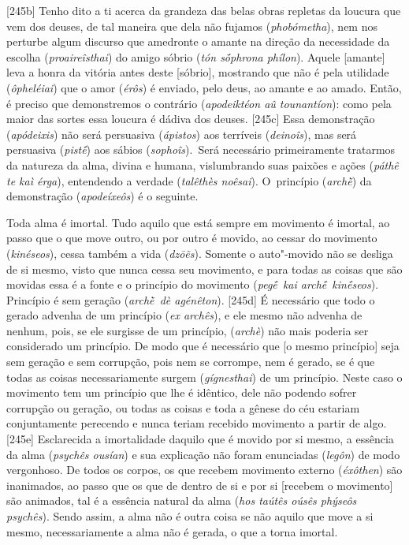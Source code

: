[245b] Tenho dito a ti acerca da grandeza das belas obras repletas
da loucura que vem dos deuses, de tal maneira que dela não fujamos
(\emph{phobómetha}), nem nos perturbe algum discurso que amedronte o
amante na direção da necessidade da escolha (\emph{proaireîsthai}) do
amigo sóbrio (\emph{tón sṓphrona phílon}). Aquele [amante] leva a
honra da vitória antes deste [sóbrio], mostrando que não é pela
utilidade (\emph{ôpheléiai}) que o amor (\emph{érôs}) é enviado, pelo
deus, ao amante e ao amado. Então, é preciso que demonstremos o contrário
(\emph{apodeiktéon aû tounantíon}): como pela maior das sortes essa
loucura é dádiva dos deuses. [245c] Essa demonstração
(\emph{apódeixis}) não será persuasiva (\emph{ápistos}) aos terríveis
(\emph{deinoîs}), mas será persuasiva (\emph{pistḗ}) aos sábios
(\emph{sophoîs}).~Será necessário primeiramente tratarmos da natureza da
alma, divina e humana, vislumbrando suas paixões e ações (\emph{páthê te
kaì érga}), entendendo a verdade (\emph{talêthès noêsai}). O~princípio
(\emph{archḕ}) da demonstração (\emph{apodeíxeôs}) é o seguinte.

Toda alma é imortal. Tudo aquilo que está sempre em movimento é imortal,
ao passo que o que move outro, ou por outro é movido, ao cessar do
movimento (\emph{kinéseos}), cessa também a vida (\emph{dzōẽs}). Somente
o auto"-movido não se desliga de si mesmo, visto que nunca cessa seu
movimento, e para todas as coisas que são movidas essa é a fonte e o
princípio do movimento (\emph{pegḗ~kai archḗ~kinḗseos}). Princípio é sem
geração (\emph{archḕ~dè agénêton}). [245d] É necessário que todo o
gerado advenha de um princípio (\emph{ex archês}), e ele mesmo não
advenha de nenhum, pois, se ele surgisse de um princípio,
(\emph{archè}) não mais poderia ser considerado um princípio. De modo
que é necessário que [o mesmo princípio] seja sem geração e sem
corrupção, pois nem se corrompe, nem é gerado, se é que todas as coisas
necessariamente surgem (\emph{gígnesthai}) de um princípio. Neste caso o
movimento tem um princípio que lhe é idêntico, dele não podendo sofrer
corrupção ou geração, ou todas as coisas e toda a gênese do céu estariam
conjuntamente perecendo e nunca teriam recebido movimento a partir de
algo. [245e] Esclarecida a imortalidade daquilo que é movido por si
mesmo, a essência da alma (\emph{psychês ousían}) e sua explicação não
foram enunciadas (\emph{legôn}) de modo vergonhoso. De todos os corpos,
os que recebem movimento externo (\emph{éxôthen}) são inanimados, ao
passo que os que de dentro de si e por si [recebem o movimento] são
animados, tal é a essência natural da alma (\emph{hos taútês oúsês
phýseôs psychês}). Sendo assim, a alma não é outra coisa se não aquilo
que move a si mesmo, necessariamente a alma não é gerada, o que a torna
imortal.

